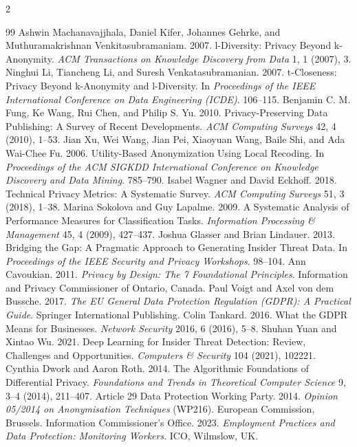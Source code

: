 \documentclass[10pt,a4paper]{article}
\begin{document}
\begin{multicols}{2}
\begin{thebibliography}{99}
 Ashwin Machanavajjhala, Daniel Kifer, Johannes Gehrke, and Muthuramakrishnan Venkitasubramaniam. 2007. l-Diversity: Privacy Beyond k-Anonymity. \textit{ACM Transactions on Knowledge Discovery from Data} 1, 1 (2007), 3.
 Ninghui Li, Tiancheng Li, and Suresh Venkatasubramanian. 2007. t-Closeness: Privacy Beyond k-Anonymity and l-Diversity. In \textit{Proceedings of the IEEE International Conference on Data Engineering (ICDE)}. 106--115.
 Benjamin C. M. Fung, Ke Wang, Rui Chen, and Philip S. Yu. 2010. Privacy-Preserving Data Publishing: A Survey of Recent Developments. \textit{ACM Computing Surveys} 42, 4 (2010), 1--53.
 Jian Xu, Wei Wang, Jian Pei, Xiaoyuan Wang, Baile Shi, and Ada Wai-Chee Fu. 2006. Utility-Based Anonymization Using Local Recoding. In \textit{Proceedings of the ACM SIGKDD International Conference on Knowledge Discovery and Data Mining}. 785--790.
 Isabel Wagner and David Eckhoff. 2018. Technical Privacy Metrics: A Systematic Survey. \textit{ACM Computing Surveys} 51, 3 (2018), 1--38.
 Marina Sokolova and Guy Lapalme. 2009. A Systematic Analysis of Performance Measures for Classification Tasks. \textit{Information Processing \& Management} 45, 4 (2009), 427--437.
 Joshua Glasser and Brian Lindauer. 2013. Bridging the Gap: A Pragmatic Approach to Generating Insider Threat Data. In \textit{Proceedings of the IEEE Security and Privacy Workshops}. 98--104.
 Ann Cavoukian. 2011. \textit{Privacy by Design: The 7 Foundational Principles}. Information and Privacy Commissioner of Ontario, Canada.
 Paul Voigt and Axel von dem Bussche. 2017. \textit{The EU General Data Protection Regulation (GDPR): A Practical Guide}. Springer International Publishing.
 Colin Tankard. 2016. What the GDPR Means for Businesses. \textit{Network Security} 2016, 6 (2016), 5--8.
 Shuhan Yuan and Xintao Wu. 2021. Deep Learning for Insider Threat Detection: Review, Challenges and Opportunities. \textit{Computers \& Security} 104 (2021), 102221.
 Cynthia Dwork and Aaron Roth. 2014. The Algorithmic Foundations of Differential Privacy. \textit{Foundations and Trends in Theoretical Computer Science} 9, 3--4 (2014), 211--407.
 Article 29 Data Protection Working Party. 2014. \textit{Opinion 05/2014 on Anonymisation Techniques} (WP216). European Commission, Brussels.
 Information Commissioner's Office. 2023. \textit{Employment Practices and Data Protection: Monitoring Workers}. ICO, Wilmslow, UK.
\end{thebibliography}
\end{multicols}
\end{document}
